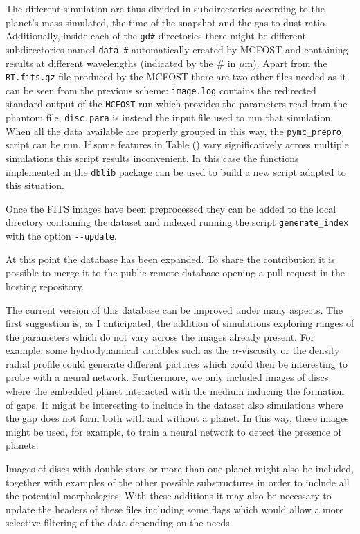 \documentclass[a4paper,10pt]{report}
\begin{document}
The different simulation are thus divided in subdirectories according to the planet's mass simulated, the time of the
snapshot and the gas to dust ratio. Additionally, inside each of the \lstinline{gd#} directories 
there might be different subdirectories named \lstinline{data_#} automatically created by MCFOST 
and containing results at different wavelengths (indicated by the \# in $\mu$m).
Apart from the \lstinline{RT.fits.gz} file produced by the MCFOST there are two other files needed as it can be seen
from the previous scheme: \lstinline{image.log} contains the redirected standard output of the \lstinline{MCFOST} run which 
provides the parameters read from the phantom file,
\lstinline{disc.para} is instead the input file used to run that simulation.
When all the data available are properly grouped in this way, the \lstinline{pymc_prepro} script
can be run. If some features in Table () vary significatively across multiple simulations this script 
results inconvenient. In this case the functions implemented in the \lstinline{dblib} package can be used
to build a new script adapted to
this situation.

Once the FITS images have been preprocessed they can be added to the local directory containing the dataset 
and indexed running the script \lstinline{generate_index} with the option \lstinline{--update}. 

At this point the database has been expanded. To share the contribution it is possible to merge it to the public remote database
opening a pull request in the hosting repository. 

The current version of this database can be improved under many aspects. The first suggestion
is, as I anticipated, the addition of simulations exploring ranges of the parameters which do not vary across the images already present.
For example, some hydrodynamical variables such as the $\alpha$-viscosity 
or the density radial profile could generate different pictures which could then be interesting to probe with a neural network.
Furthermore, we only included images of discs where the embedded planet interacted with the medium inducing the formation of
gaps. It might be interesting to include in the dataset also simulations where the gap does
not form both with and without a planet.
In this way, these images might be used, for example, to train a neural network to detect the presence of
planets. 

Images of discs with double stars or more than one planet might also be included, together with examples
of the other possible substructures in order to include all the potential morphologies.
With these additions it may also be necessary to update the headers of these files including some flags which would allow 
a more selective filtering of the data depending on the needs.
\end{document}

